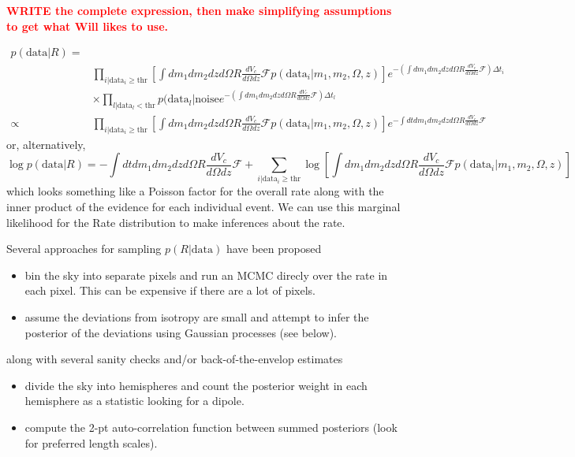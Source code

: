 \documentclass{article}
\begin{document}
\newpage
\textcolor{red}{\textbf{WRITE the complete expression, then make simplifying assumptions to get what Will likes to use.}}

\begin{align}
    p(\mathrm{data}|R) = & \\
                         & \prod\limits_{i|\mathrm{data}_i\geq\mathrm{thr}} \left[ \int dm_1 dm_2 dz d\Omega R \frac{dV_c}{d\Omega dz} \mathcal{F} p(\mathrm{data}_i|m_1, m_2, \Omega, z) \right] e^{-\left(\int dm_1 dm_2 dz d\Omega R \frac{dV_c}{d\Omega dz} \mathcal{F}\right) \Delta t_i} \\
                         & \times \prod\limits_{l|\mathrm{data}_l<\mathrm{thr}} p(\mathrm{data}_l|\mathrm{noise} e^{-\left(\int dm_1 dm_2 dz d\Omega R \frac{dV_c}{d\Omega dz} \mathcal{F}\right) \Delta t_l} \\
                 \propto & \prod\limits_{i|\mathrm{data}_i\geq\mathrm{thr}} \left[ \int dm_1 dm_2 dz d\Omega R \frac{dV_c}{d\Omega dz} \mathcal{F} p(\mathrm{data}_i|m_1, m_2, \Omega, z) \right] e^{-\int dt dm_1 dm_2 dz d\Omega R \frac{dV_c}{d\Omega dz} \mathcal{F}}
\end{align}
or, alternatively,
\begin{equation}
    \log p(\mathrm{data}|R) = - \int dt dm_1 dm_2 dz d\Omega R \frac{dV_c}{d\Omega dz} \mathcal{F} + \sum\limits_{i|\mathrm{data}_i\geq\mathrm{thr}} \log \left[ \int dm_1 dm_2 dz d\Omega R \frac{dV_c}{d\Omega dz} \mathcal{F} p(\mathrm{data}_i|m_1, m_2, \Omega, z) \right]
\end{equation}
which looks something like a Poisson factor for the overall rate along with the inner product of the evidence for each individual event.
We can use this marginal likelihood for the Rate distribution to make inferences about the rate.

Several approaches for sampling $p(R|\mathrm{data})$ have been proposed
\begin{itemize}
    \item bin the sky into separate pixels and run an MCMC direcly over the rate in each pixel. This can be expensive if there are a lot of pixels.
    \item assume the deviations from isotropy are small and attempt to infer the posterior of the deviations using Gaussian processes (see below).
\end{itemize}
along with several sanity checks and/or back-of-the-envelop estimates
\begin{itemize}
    \item divide the sky into hemispheres and count the posterior weight in each hemisphere as a statistic looking for a dipole.
    \item compute the 2-pt auto-correlation function between summed posteriors (look for preferred length scales).
\end{itemize}
\end{document}
